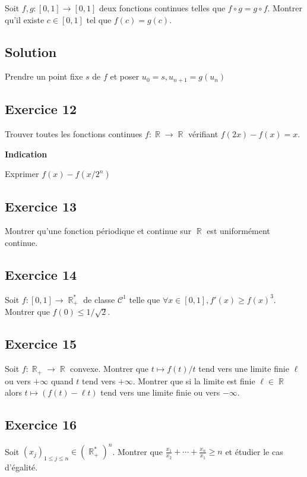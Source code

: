 \documentclass{article}
\DeclareMathOperator{\R}{\mathbb{R}}
\begin{document}
Soit $f, g : [0, 1] \to [0, 1]$ deux fonctions continues telles que $f\circ g = g\circ f$. Montrer qu'il existe $c\in [0, 1]$ tel que $f(c) = g(c)$. 

\subsection*{Solution} 

Prendre un point fixe $s$ de $f$ et poser $u_0 = s, u_{n+1} = g(u_n)$ 

\subsection*{Exercice 12} 

Trouver toutes les fonctions continues $f : \R \to \R$ vérifiant $f(2x) - f(x) = x$. 

\textbf{Indication} 

Exprimer $f(x) - f(x/2^n)$  

\subsection*{Exercice 13} 

Montrer qu'une fonction périodique et continue sur $\R$ est uniformément continue. 

\subsection*{Exercice 14} 

Soit $f : [0, 1] \to \R_+^*$ de classe $\mathcal{C}^1$ telle que $\forall x \in [0, 1], f'(x) \geq f(x)^3$. Montrer que $f(0) \leq 1/\sqrt{2}$. 

\subsection*{Exercice 15} 

Soit $f : \R_+ \to \R$ convexe. Montrer que $t \mapsto f(t)/t$ tend vers une limite finie $\ell$ ou vers $+\infty$ quand $t$ tend vers $+\infty$. Montrer que si la limite est finie $\ell \in \R$ alors $t \mapsto (f(t) - \ell t)$ tend vers une limite finie ou vers $-\infty$. 

\subsection*{Exercice 16} 

Soit $(x_j)_{1\leq j \leq n} \in (\R_+^*)^n$. Montrer que $\displaystyle \frac{x_1}{x_2} + \cdots + \frac{x_n}{x_1} \geq n$ et étudier le cas d'égalité. 
\end{document}
